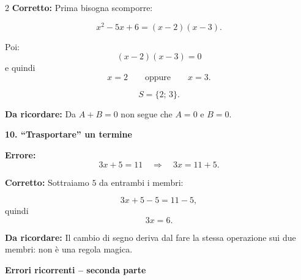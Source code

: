 \documentclass[9pt,a4paper]{extarticle}
\newcommand{\err}[1]{%
	{\color{errore}\textbf{Errore:}} #1
}
\newcommand{\corr}[1]{%
	{\color{corretto}\textbf{Corretto:}} #1
}
\newcommand{\regola}[1]{%
	{\color{titolo}\textbf{Da ricordare:}} #1
}
\newcommand{\voce}[1]{%
	\vspace{3pt}
	{\color{titolo}\textbf{#1}}\par
	\vspace{1pt}
}
\begin{document}
\begin{multicols}{2}
\corr{Prima bisogna scomporre:}
\[
x^2-5x+6
=
(x-2)(x-3).
\]

Poi:
\[
(x-2)(x-3)=0
\]
e quindi
\[
x=2
\qquad\text{oppure}\qquad
x=3.
\]

\[
S=\{2;\,3\}.
\]

\regola{Da $A+B=0$ non segue che $A=0$ e $B=0$.}

\voce{10. ``Trasportare'' un termine}

\err{
\[
3x+5=11
\quad\Rightarrow\quad
3x=11+5.
\]
}

\corr{Sottraiamo $5$ da entrambi i membri:}
\[
3x+5-5=11-5,
\]
quindi
\[
3x=6.
\]

\regola{Il cambio di segno deriva dal fare la stessa
operazione sui due membri: non è una regola magica.}

\end{multicols}


\newpage

\begin{center}
	{\large\bfseries Errori ricorrenti -- seconda parte}
\end{center}

\vspace{-2mm}
\end{document}
